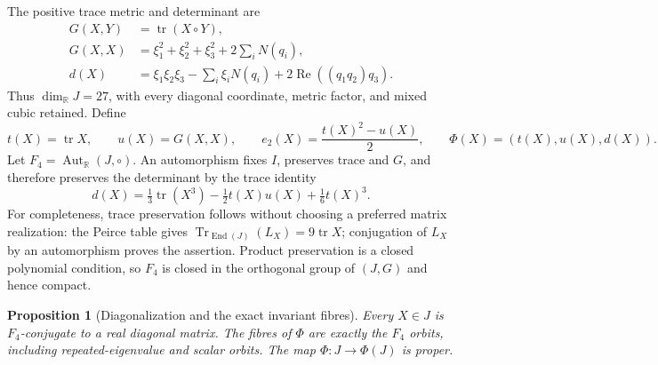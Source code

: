 \documentclass[11pt]{article}
\newtheorem{proposition}[theorem]{Proposition}
\theoremstyle{definition}
\begin{document}
The positive trace metric and determinant are
\begin{equation}
 \begin{split}
 G(X,Y)&=\operatorname{tr}(X\circ Y),\\
 G(X,X)&=\xi_1^2+\xi_2^2+\xi_3^2+2\sum_iN(q_i),\\
 d(X)&=\xi_1\xi_2\xi_3-\sum_i\xi_iN(q_i)
              +2\operatorname{Re}((q_1q_2)q_3).
 \end{split}
 \label{ocb:eq:metric-determinant}\tag{OCB2}
\end{equation}
Thus $\dim_{\mathbb R}J=27$, with every diagonal coordinate, metric
factor, and mixed cubic retained. Define
\begin{equation}
 t(X)=\operatorname{tr}X,\qquad u(X)=G(X,X),\qquad
 e_2(X)=\frac{t(X)^2-u(X)}2,\qquad
 \Phi(X)=(t(X),u(X),d(X)).
 \label{ocb:eq:invariants}\tag{OCB3}
\end{equation}
Let $F_4=\operatorname{Aut}_{\mathbb R}(J,\circ)$. An automorphism
fixes $I$, preserves trace and $G$, and therefore preserves the
determinant by the trace identity
\begin{equation}
 d(X)=\tfrac13\operatorname{tr}(X^3)
 -\tfrac12t(X)u(X)+\tfrac16t(X)^3.
 \label{ocb:eq:trace-determinant}\tag{OCB4}
\end{equation}
For completeness, trace preservation follows without choosing a
preferred matrix realization: the Peirce table gives
$\operatorname{Tr}_{\operatorname{End}(J)}(L_X)=9\operatorname{tr}X$;
conjugation of $L_X$ by an automorphism proves the assertion. Product
preservation is a closed polynomial condition, so $F_4$ is closed in the
orthogonal group of $(J,G)$ and hence compact.

\begin{proposition}[Diagonalization and the exact invariant fibres]
\label{ocb:prop:invariant-fibres}
Every $X\in J$ is $F_4$-conjugate to a real diagonal matrix. The fibres
of $\Phi$ are exactly the $F_4$ orbits, including repeated-eigenvalue
and scalar orbits. The map $\Phi:J\to\Phi(J)$ is proper.
\end{proposition}
\end{document}
